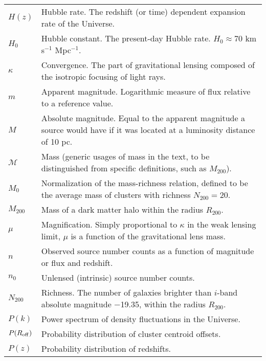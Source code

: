 \begin{tabular}{p{0.6in}p{5.8in}}
$H(z)$ & Hubble rate. The redshift (or time) dependent expansion rate of the Universe. \\
$H_0$ & Hubble constant. The present-day Hubble rate. $H_0 \approx 70$ km s$^{-1}$ Mpc$^{-1}$. \\
$\kappa$ & Convergence. The part of gravitational lensing composed of the isotropic focusing of light rays. \\
$m$ & Apparent magnitude. Logarithmic measure of flux relative to a reference value. \\
$M$ & Absolute magnitude. Equal to the apparent magnitude a source would have if it was located at a luminosity distance of 10 pc. \\
${\mathscr M}$ & Mass (generic usages of mass in the text, to be distinguished from specific definitions, such as $M_{200}$). \\
$M_0$ & Normalization of the mass-richness relation, defined to be the average mass of clusters with richness $N_{200} = 20$. \\
$M_{200}$ & Mass of a dark matter halo within the radius $R_{200}$. \\
$\mu$ & Magnification. Simply proportional to $\kappa$ in the weak lensing limit, $\mu$ is a function of the gravitational lens mass. \\
$n$ & Observed source number counts as a function of magnitude or flux and redshift. \\
$n_0$ & Unlensed (intrinsic) source number counts. \\
$N_{200}$ & Richness. The number of galaxies brighter than $i$-band absolute magnitude $-$19.35, within the radius $R_{200}$. \\
$P(k)$ & Power spectrum of density fluctuations in the Universe. \\
$P(R_{\rm off})$ & Probability distribution of cluster centroid offsets. \\
$P(z)$ & Probability distribution of redshifts. \\

\end{tabular}

